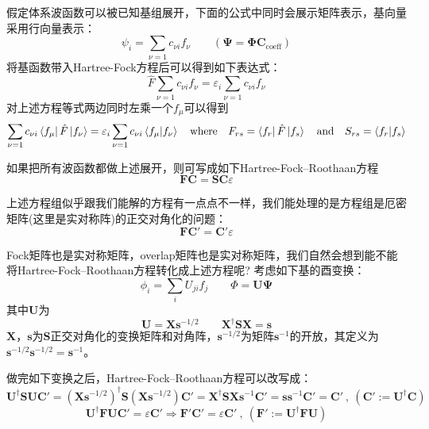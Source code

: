 假定体系波函数可以被已知基组展开，下面的公式中同时会展示矩阵表示，基向量采用行向量表示：
\[\psi_i=\sum_{\nu=1}c_{\nu i}f_{\nu} \qquad (\mathbf{\Psi} = \mathbf{\Phi} \mathbf{C}_{\text{coeff}})\]
将基函数带入Hartree-Fock方程后可以得到如下表达式：
\[\hat{F}\sum_{\nu=1}c_{\nu i}f_{\nu}=\varepsilon_i\sum_{\nu=1}c_{\nu i}f_{\nu}\]
对上述方程等式两边同时左乘一个$f_{\mu}$可以得到
\[\sum_{\nu=1}c_{\nu i}\bra{f_{\mu}}\hat{F}\ket{f_{\nu}}=\varepsilon_i\sum_{\nu=1}c_{\nu i}\bra{f_{\mu}}\ket{f_{\nu}} \quad \text{where} \quad F_{rs}=\bra{f_r}\hat{F}\ket{f_s} \quad \text{and} \quad S_{rs}=\bra{f_r}\ket{f_s}\]

如果把所有波函数都做上述展开，则可写成如下Hartree-Fock–Roothaan方程
\[\mathbf{F}\mathbf{C}=\mathbf{S}\mathbf{C}\varepsilon\]

上述方程组似乎跟我们能解的方程有一点点不一样，我们能处理的是方程组是厄密矩阵(这里是实对称阵)的正交对角化的问题：
\[\mathbf{F}\mathbf{C}'=\mathbf{C}'\varepsilon\]

Fock矩阵也是实对称矩阵，overlap矩阵也是实对称矩阵，我们自然会想到能不能将Hartree-Fock–Roothaan方程转化成上述方程呢?
考虑如下基的酉变换：
\[\phi_i = \sum_{i}U_{ji}f_j \qquad \mathbf{\varPhi}=\mathbf{U}\mathbf{\Psi}\]
其中$\mathbf{U}$为
\[\mathbf{U}=\mathbf{X}\mathbf{s}^{-1/2} \qquad \mathbf{X}^{\dagger}\mathbf{S}\mathbf{X}=\mathbf{s}\]
$\mathbf{X}$，$\mathbf{s}$为$\mathbf{S}$正交对角化的变换矩阵和对角阵，$\mathbf{s}^{-1/2}$为矩阵$\mathbf{s}^{-1}$的开放，其定义为$\mathbf{s}^{-1/2}\mathbf{s}^{-1/2}=\mathbf{s}^{-1}$。

做完如下变换之后，Hartree-Fock–Roothaan方程可以改写成：
\[\mathbf{U}^{\dagger}\mathbf{S}\mathbf{U}\mathbf{C}'=(\mathbf{X}\mathbf{s}^{-1/2})^{\dagger}\mathbf{S}(\mathbf{X}\mathbf{s}^{-1/2})\mathbf{C}'=\mathbf{X}^{\dagger}\mathbf{S}\mathbf{X}\mathbf{s}^{-1}\mathbf{C}'=\mathbf{s}\mathbf{s}^{-1}\mathbf{C}'=\mathbf{C}' \ , \ (\mathbf{C}':=\mathbf{U}^{\dagger}\mathbf{C})\]
\[\mathbf{U}^{\dagger}\mathbf{F}\mathbf{U}\mathbf{C}'=\varepsilon\mathbf{C}' \Rightarrow \mathbf{F}'\mathbf{C}'=\varepsilon\mathbf{C}' \ , \ (\mathbf{F}':=\mathbf{U}^{\dagger}\mathbf{F}\mathbf{U})\]

